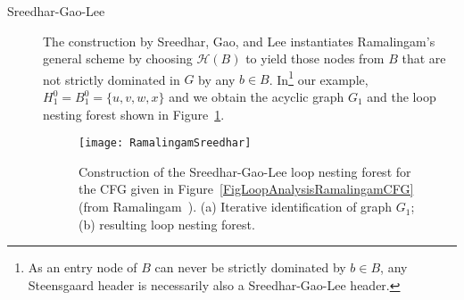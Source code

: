 \begin{description}
  \item[Sreedhar-Gao-Lee] 
    The construction by Sreedhar, Gao, and Lee instantiates
    Ramalingam's general scheme by choosing $\mathcal{H}(B)$ to yield
    those nodes from $B$ that are not strictly dominated in $G$ by any
    $b\in B$. In\footnote{As an entry node of $B$ can never be
    strictly dominated by $b \in B$, any Steensgaard header is
    necessarily also a Sreedhar-Gao-Lee header.} our example, $H^0_1 =
    B^0_1 = \{u, v, w, x\}$ and we obtain the acyclic graph $G_1$ and
    the loop nesting forest shown in
    Figure~\ref{FigLoopAnalysisRamalingamSreedhar}.

    \begin{figure}
      \begin{center}
        \texttt{[image: RamalingamSreedhar]}
      \end{center}
      \caption{\label{FigLoopAnalysisRamalingamSreedhar} Construction
        of the Sreedhar-Gao-Lee loop nesting forest for the CFG given
        in Figure~\ref{FigLoopAnalysisRamalingamCFG} (from
        Ramalingam~\cite{DBLP:journals/toplas/Ramalingam02}). (a) Iterative
        identification of graph $G_1$; 
        (b) resulting loop nesting forest.}
    \end{figure}


\end{description}
